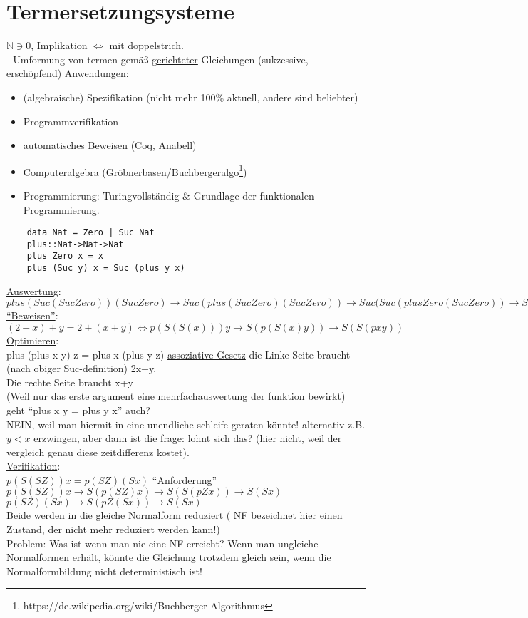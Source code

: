 \documentclass{article}
\begin{document}
	\section{Termersetzungsysteme}
	$\mathbb{N}\ni 0$, Implikation $\iff$ mit doppelstrich.\\
	- Umformung von termen gemäß \underline{gerichteter} Gleichungen (sukzessive, erschöpfend)
	Anwendungen:
	\begin{itemize}[noitemsep,topsep=0pt]
		\item (algebraische) Spezifikation (nicht mehr 100\% aktuell, andere sind beliebter)
		\item Programmverifikation
		\item automatisches Beweisen (Coq, Anabell)
		\item Computeralgebra (Gröbnerbasen/Buchbergeralgo\footnote{https://de.wikipedia.org/wiki/Buchberger-Algorithmus})
		\item Programmierung: Turingvollständig \& Grundlage der funktionalen Programmierung.
	\end{itemize}
	\begin{verbatim}
	data Nat = Zero | Suc Nat
	plus::Nat->Nat->Nat
	plus Zero x = x
	plus (Suc y) x = Suc (plus y x)
	\end{verbatim}
	\underline{Auswertung}:\\
	 $plus(Suc(Suc Zero)) (Suc Zero) \to Suc(plus (Suc Zero) (Suc Zero)) \to 
		Suc (Suc(plus Zero (Suc Zero)) \to Suc(Suc(Suc(zero)))$\\
	\underline{``Beweisen''}:\\
	$(2+x) +y = 2+(x+y)\iff p (S(S(x))) y \to S( p( S(x) y))\to S( S ( p x y))$\\
	\underline{Optimieren}:\\
	plus (plus x y) z = plus x (plus y z) \underline{assoziative Gesetz}
	die Linke Seite braucht (nach obiger Suc-definition) 2x+y.\\
	Die rechte Seite braucht x+y\\
	(Weil nur das erste argument eine mehrfachauswertung der funktion bewirkt)\\
	geht ``plus x y = plus y x'' auch?\\
	NEIN, weil man hiermit in eine unendliche schleife geraten könnte! alternativ z.B. $y<x$ erzwingen, aber dann ist die frage: lohnt sich das? (hier nicht, weil der vergleich genau diese zeitdifferenz kostet).\\
	\underline{Verifikation}:\\
	$p ( S ( S Z)) x = p (S Z) (S x)$ ``Anforderung''\\
	$p (S ( S Z)) x \to S (p ( S Z ) x)\to S( S ( p Z x)) \to S ( S x)$\\
	$p (S Z) (S x)\to S ( p Z (S x)) \to S ( S x)$\\
	Beide werden in die gleiche Normalform reduziert ( NF bezeichnet hier einen Zustand, der nicht mehr reduziert werden kann!)\\
	Problem: Was ist wenn man nie eine NF erreicht? Wenn man ungleiche Normalformen erhält, könnte die Gleichung trotzdem gleich sein, wenn die Normalformbildung nicht deterministisch ist!\\
\end{document}
